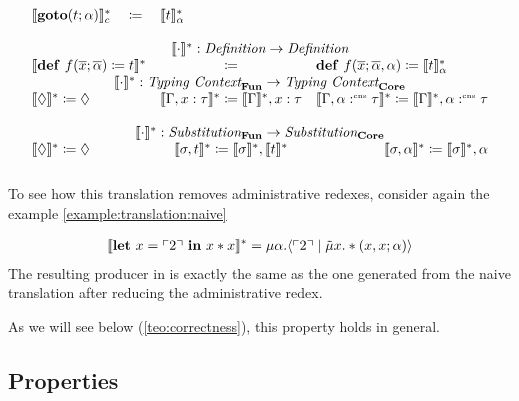 \[\begin{array}{rcl rcl}
    \translatestar{\goto{t}{\alpha}}{c} & \coloneq & \translatestar{t}{\alpha} \\
    \\
    \multicolumn{6}{c}{\translatestar{\cdot}{} : \emph{Definition} \rightarrow \emph{Definition}}\\
    \multicolumn{2}{r}{\translatestar{\defi{f(\overline{x}; \overline{\alpha})}{t}}{}} & \multicolumn{2}{c}{\coloneq} & \multicolumn{2}{l}{\defi{f(\overline{x}; \overline{\alpha}, \alpha)}{\translatestar{t}{\alpha}}} 
    \\
    \multicolumn{6}{c}{\translatestar{\cdot{}}{}: \emph{Typing Context}_{\surfacelang{}}\rightarrow \emph{Typing Context}_{\targetlang{}}}\\
    \multicolumn{2}{l}{\translatestar{\nil}{} \coloneq \nil} & 
    \multicolumn{2}{c}{\translatestar{\Gamma,x:\tau}{} \coloneq \translatestar{\Gamma}{},x:\tau} &
    \multicolumn{2}{r}{\translatestar{\Gamma,\alpha\cnt\tau}{} \coloneq \translatestar{\Gamma}{},\alpha\cnt\tau}\\
    \\
    \multicolumn{6}{c}{\translatestar{\cdot{}}{}{}:\emph{Substitution}_{\surfacelang{}}\rightarrow\emph{Substitution}_{\targetlang{}}}\\
    \multicolumn{2}{l}{\translatestar{\nil}{} \coloneq \nil} & 
    \multicolumn{2}{c}{\translatestar{\sigma,t}{} \coloneq \translatestar{\sigma}{},\translatestar{t}{}} &
    \multicolumn{2}{r}{\translatestar{\sigma,\alpha}{} \coloneq \translatestar{\sigma}{},\alpha}\\
    \\

  \end{array}
\]
To see how this translation removes administrative redexes, consider again the example \cref{example:translation:naive}
\begin{example}
  \begin{align*}
    \llbracket \mathbf{let}\ x = \ulcorner 2 \urcorner\ \mathbf{in}\ x*x \rrbracket^* = \mu\alpha.\langle \ulcorner 2 \urcorner \mid \tilde\mu x.*(x,x;\alpha) \rangle
  \end{align*}
  The resulting producer in \targetlang{} is exactly the same as the one generated from the naive translation after reducing the administrative redex.
\end{example}
As we will see below (\cref{teo:correctness}), this property holds in general.

\subsection{Properties}
\label{subsec:translation:properties}

